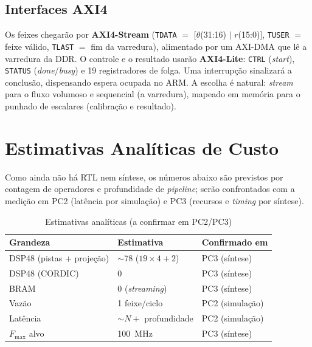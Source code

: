 \documentclass[conference]{IEEEtran}
\begin{document}
\subsection{Interfaces AXI4}

Os feixes chegar\~ao por \textbf{AXI4-Stream} (\texttt{TDATA} $=$ [$\theta$(31:16)
$|$ $r$(15:0)], \texttt{TUSER} $=$ feixe v\'alido, \texttt{TLAST} $=$ fim da
varredura), alimentado por um AXI-DMA que l\^e a varredura da DDR. O controle e o
resultado usar\~ao \textbf{AXI4-Lite}: \texttt{CTRL} (\emph{start}),
\texttt{STATUS} (\emph{done}/\emph{busy}) e \num{19} registradores de folga. Uma
interrup\c{c}\~ao sinalizar\'a a conclus\~ao, dispensando espera ocupada no ARM.
A escolha \'e natural: \emph{stream} para o fluxo volumoso e sequencial (a
varredura), mapeado em mem\'oria para o punhado de escalares (calibra\c{c}\~ao e
resultado).

\section{Estimativas Anal\'iticas de Custo}

Como ainda n\~ao h\'a RTL nem s\'intese, os n\'umeros abaixo s\~ao previstos por
contagem de operadores e profundidade de \emph{pipeline}; ser\~ao confrontados
com a medi\c{c}\~ao em PC2 (lat\^encia por simula\c{c}\~ao) e PC3 (recursos e
\emph{timing} por s\'intese).

\begin{table}[!t]
\caption{Estimativas anal\'iticas (a confirmar em PC2/PC3)}
\label{tab:est}
\centering\footnotesize
\begin{tabular}{@{}lll@{}}
\toprule
\textbf{Grandeza} & \textbf{Estimativa} & \textbf{Confirmado em} \\
\midrule
DSP48 (pistas + proje\c{c}\~ao) & $\sim$\num{78} ($19\times4+2$) & PC3 (s\'intese) \\
DSP48 (CORDIC)      & \num{0}                    & PC3 (s\'intese) \\
BRAM                & \num{0} (\emph{streaming}) & PC3 (s\'intese) \\
Vaz\~ao             & \num{1} feixe/ciclo        & PC2 (simula\c{c}\~ao) \\
Lat\^encia          & $\sim N +$ profundidade    & PC2 (simula\c{c}\~ao) \\
$F_{\max}$ alvo     & \SI{100}{\mega\hertz}      & PC3 (s\'intese) \\
\bottomrule
\end{tabular}
\end{table}
\end{document}

